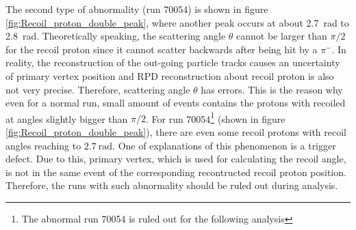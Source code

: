The second type of abnormality (run 70054) is shown in figure \ref{fig:Recoil_proton_double_peak}, where another peak occurs at about \SI{2.7}{\radian} to \SI{2.8}{\radian}. Theoretically speaking, the scattering angle $\theta$ cannot be larger than $\pi/2$ for the recoil proton since it cannot scatter backwards after being hit by a $\pi^-$. In reality, the reconstruction of the out-going particle tracks causes an uncertainty of primary vertex position and RPD reconstruction about recoil proton is also not very precise. Therefore, scattering angle $\theta$ has errors. This is the reason why even for a normal run, small amount of events contains the protons with recoiled at angles slightly bigger than $\pi/2$. For run 70054\footnote[2]{The abnormal run 70054 is ruled out for the following analysis} (shown in figure \ref{fig:Recoil_proton_double_peak}), there are even some recoil protons with recoil angles reaching to $\SI{2.7}{\radian}$. One of explanations of this phenomenon is a trigger defect. Due to this, primary vertex, which is used for calculating the recoil angle, is not in the same event of the corresponding recontructed recoil proton position. Therefore, the runs with such abnormality should be ruled out during analysis.





